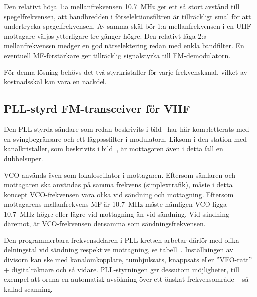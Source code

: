 Den relativt höga 1:a mellanfrekvensen \qty{10,7}{\mega\hertz} ger ett så stort
avstånd till spegelfrekvensen, att bandbredden i förselektionsfiltren
är tillräckligt smal för att undertrycka spegelfrekvensen.
Av samma skäl bör 1:a mellanfrekvensen i en UHF-mottagare väljas ytterligare
tre gånger högre.
Den relativt låga 2:a mellanfrekvensen medger en god närselektering
redan med enkla bandfilter.
En eventuell MF-förstärkare ger tillräcklig signalstyrka till FM-demodulatorn.

För denna lösning behövs det två styrkristaller för varje
frekvenskanal, vilket av kostnadsskäl kan vara en nackdel.

\subsection{PLL-styrd FM-transceiver för VHF}


Den PLL-styrda sändare som redan beskrivits i bild~ har
här kompletterats med en svingbegränsare och ett lågpassfilter i modulatorn.
Liksom i den station med kanalkristaller, som beskrivits i
bild~, är mottagaren även i detta fall en dubbelsuper.

VCO används även som lokaloscillator i mottagaren.
Eftersom sändaren och mottagaren ska användas på samma frekvens
(simplextrafik), måste i detta koncept VCO-frekvensen vara olika vid
sändning och mottagning.
Eftersom mottagarens mellanfrekvens MF är \qty{10,7}{\mega\hertz} måste nämligen
VCO ligga \qty{10,7}{\mega\hertz} högre eller lägre vid mottagning än vid
sändning.
Vid sändning däremot, är VCO-frekvensen densamma som sändningsfrekvensen.

Den programmerbara frekvensdelaren i PLL-kret\-sen arbetar därför med olika
delningstal vid sändning respektive mottagning, se tabell~.
Inställningen av divisorn kan ske med kanalomkopplare, tumhjulssats,
knappsats eller ''VFO-ratt'' + digitalräknare och så vidare.
PLL-styrningen ger dessutom möjligheter, till exempel att ordna en automatisk
avsökning över ett önskat frekvensområde -- så kallad scanning.

